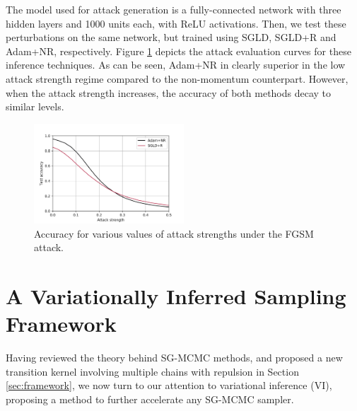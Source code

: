 The model used for attack generation is a fully-connected network with three hidden layers and 1000 units each, with ReLU activations. Then, we test these perturbations on the same network, but trained using SGLD, SGLD+R and Adam+NR, respectively. Figure \ref{fig:attacks} depicts the attack evaluation curves for these inference techniques. As can be seen, Adam+NR in clearly superior in the low attack strength regime compared to the non-momentum counterpart. However, when the attack strength increases, the accuracy of both methods decay to similar levels.



\begin{figure}[h]
    \centering
\includegraphics[width=0.5\textwidth]{img/adv-2}
    \caption{Accuracy for various values of attack strengths under the FGSM attack.}\label{fig:attacks}
\end{figure}


















\section{A Variationally Inferred Sampling Framework}\label{sec:main}

Having reviewed the theory behind SG-MCMC methods, and proposed a new  transition kernel involving multiple chains with repulsion in Section \ref{sec:framework}, we now turn to our attention to variational inference (VI), proposing a method to further accelerate any SG-MCMC sampler.

